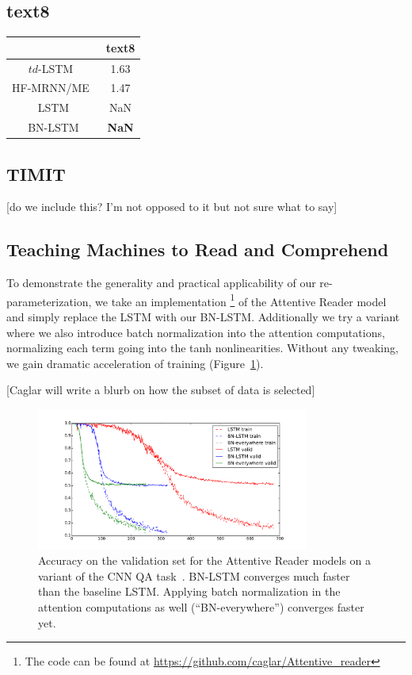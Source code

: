 \documentclass{article} %
\begin{document}
\subsection{text8}

\begin{tabular}{c|c}
  & text8 \\
  \hline
  $td$-LSTM~\cite{zhang2016architectural} & 1.63 \\
  HF-MRNN/ME~\cite{mikolov2012subword} & 1.47 \\
  \hline
  LSTM & NaN \\
  BN-LSTM & \textbf{NaN} \\
\end{tabular}

\subsection{TIMIT}

[do we include this? I'm not opposed to it but not sure what to say]

\subsection{Teaching Machines to Read and Comprehend}

To demonstrate the generality and practical applicability of our
re-parameterization, we take an implementation
\footnote{The code can be found at \url{https://github.com/caglar/Attentive_reader}}
of the Attentive Reader model~\cite{attentivereader} and simply replace the LSTM with our
BN-LSTM.
Additionally we try a variant where we also introduce batch
normalization into the attention computations, normalizing each term
going into the tanh nonlinearities.
Without any tweaking, we gain dramatic acceleration of training (Figure~\ref{fig:attr_valid}).

[Caglar will write a blurb on how the subset of data is selected]

\begin{figure}
\center
\includegraphics[width=0.8\textwidth]{figures/attr_valid.pdf}
\caption{
Accuracy on the validation set for the Attentive Reader models on a variant of the CNN QA task~\cite{attentivereader}.
BN-LSTM converges much faster than the baseline LSTM.
Applying batch normalization in the attention computations as well (``BN-everywhere'') converges faster yet.
}
\label{fig:attr_valid}
\end{figure}
\end{document}
